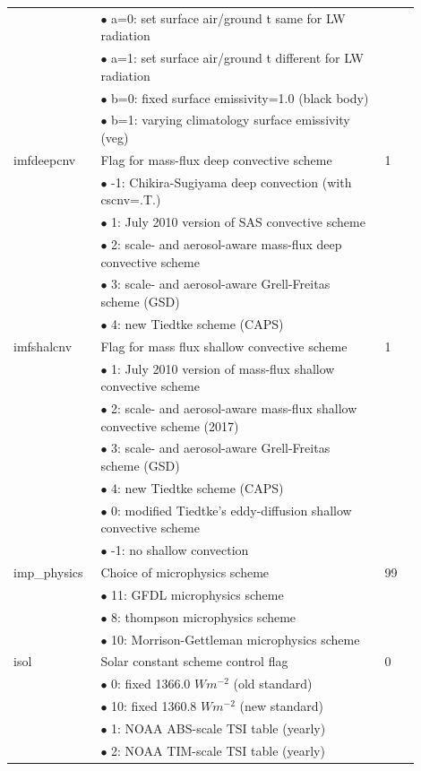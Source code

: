 \documentclass[11pt,fleqn]{report}              %
\begin{document}
\begin{enumerate}
{\begin{longtable}{p{0.17\linewidth} | p{0.65\linewidth} | p{0.08\linewidth} }
& $\bullet$ a=0: set surface air/ground t same for LW radiation & \\
& $\bullet$ a=1: set surface air/ground t different for LW radiation & \\
& $\bullet$ b=0: fixed surface emissivity=1.0 (black body) & \\
& $\bullet$ b=1: varying climatology surface emissivity (veg) & \\
imfdeepcnv & Flag for mass-flux deep convective scheme & 1 \\
& $\bullet$ -1: Chikira-Sugiyama deep convection (with cscnv=.T.) & \\
& $\bullet$ 1: July 2010 version of SAS convective scheme & \\
& $\bullet$ 2: scale- and aerosol-aware mass-flux deep convective scheme & \\
& $\bullet$ 3: scale- and aerosol-aware Grell-Freitas scheme (GSD) & \\
& $\bullet$ 4: new Tiedtke scheme (CAPS) & \\
imfshalcnv & Flag for mass flux shallow convective scheme & 1 \\
& $\bullet$ 1: July 2010 version of mass-flux shallow convective scheme & \\
& $\bullet$ 2: scale- and aerosol-aware mass-flux shallow convective scheme (2017) & \\
& $\bullet$ 3: scale- and aerosol-aware Grell-Freitas scheme (GSD) & \\
& $\bullet$ 4: new Tiedtke scheme (CAPS) & \\
& $\bullet$ 0: modified Tiedtke's eddy-diffusion shallow convective scheme & \\
& $\bullet$ -1: no shallow convection & \\
imp\_physics & Choice of microphysics scheme & 99 \\
& $\bullet$ 11: GFDL microphysics scheme & \\
& $\bullet$ 8: thompson microphysics scheme & \\
& $\bullet$ 10: Morrison-Gettleman microphysics scheme & \\
isol & Solar constant scheme control flag & 0 \\
& $\bullet$ 0: fixed 1366.0 $Wm^{-2}$ (old standard) & \\
& $\bullet$ 10: fixed 1360.8 $Wm^{-2}$ (new standard) & \\
& $\bullet$ 1: NOAA ABS-scale TSI table (yearly) & \\
& $\bullet$ 2: NOAA TIM-scale TSI table (yearly) & \\

\end{longtable}}
\end{enumerate}
\end{document}
